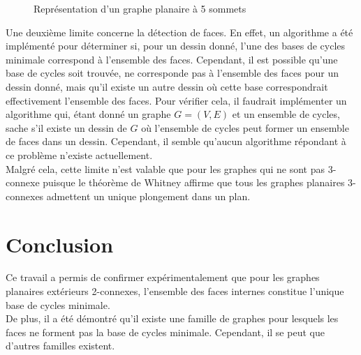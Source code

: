 \documentclass{article}
\begin{document}
\begin{figure}[h]
    \centering

    \caption{Représentation d'un graphe planaire à 5 sommets}
    \label{carre_coupe}
\end{figure}

Une deuxième limite concerne la détection de faces. En effet, un algorithme a été implémenté pour déterminer si, pour un dessin donné, l'une des bases de cycles minimale correspond à l'ensemble des faces. Cependant, il est possible qu'une base de cycles soit trouvée, ne corresponde pas à l'ensemble des faces pour un dessin donné, mais qu'il existe un autre dessin où cette base correspondrait effectivement l'ensemble des faces. Pour vérifier cela, il faudrait implémenter un algorithme qui, étant donné un graphe $G=(V,E)$ et un ensemble de cycles, sache s'il existe un dessin de $G$ où l'ensemble de cycles peut former un ensemble de faces dans un dessin. Cependant, il semble qu'aucun algorithme répondant à ce problème n'existe actuellement. \\
Malgré cela, cette limite n'est valable que pour les graphes qui ne sont pas 3-connexe puisque le théorème de Whitney affirme que tous les graphes planaires 3-connexes admettent un unique plongement dans un plan.

\section{Conclusion}

Ce travail a permis de confirmer expérimentalement que pour les graphes planaires extérieurs 2-connexes, l'ensemble des faces internes constitue l'unique base de cycles minimale. \\
De plus, il a été démontré qu'il existe une famille de graphes pour lesquels les faces ne forment pas la base de cycles minimale. Cependant, il se peut que d'autres familles existent. \\
\end{document}
